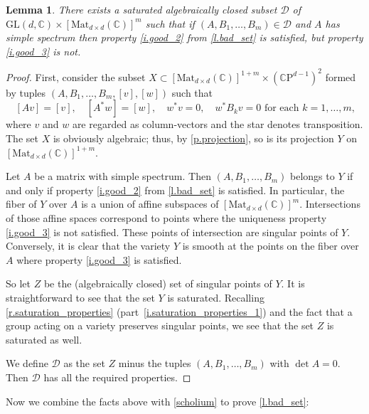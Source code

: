 \documentclass[10pt, a4paper]{amsart}
\theoremstyle{plain}
\newtheorem{lemma}{Lemma}[section]
\theoremstyle{definition}
\theoremstyle{remark}
\theoremstyle{note}
\numberwithin{equation}{section}
\begin{document}
\begin{lemma}\label{l.double_zero}
There exists a saturated algebraically closed subset 
${\mathcal{D}}$ of ${\mathrm{GL}}(d,{\mathbb{C}})\times [{\mathrm{Mat}}_{d\times d}({\mathbb{C}})]^m$ 
such that
if $(A, B_1, \dots, B_m) \in {\mathcal{D}}$ and $A$ has simple spectrum then 
property \ref{i.good_2} from \cref{l.bad_set} is satisfied, 
but property \ref{i.good_3} is not.
\end{lemma}

\begin{proof}
First, consider the subset $X \subset [{\mathrm{Mat}}_{d\times d}({\mathbb{C}})]^{1+m} \times ({\mathbb{C}\mathrm{P}}^{d-1})^2$
formed by tuples $(A,B_1,\dots,B_m,[v],[w])$ such that
$$
[Av] = [v], \quad [A^* w] = [w], \quad w^* v = 0, \quad w^* B_k v = 0 \text{ for each $k=1,\dots,m$,}
$$
where $v$ and $w$ are regarded as column-vectors and the star denotes transposition.
The set $X$ is obviously algebraic; thus, by \cref{p.projection}, so is its projection
$Y$ on $[{\mathrm{Mat}}_{d\times d}({\mathbb{C}})]^{1+m}$.

Let $A$ be a matrix with simple spectrum.
Then $(A, B_1, \dots, B_m)$
belongs to $Y$ if and only if property \ref{i.good_2} from \cref{l.bad_set} is satisfied.
In particular, the fiber of $Y$ over $A$ is 
a union of affine subspaces of $[{\mathrm{Mat}}_{d\times d}({\mathbb{C}})]^m$.
Intersections of those affine spaces correspond to points where the uniqueness 
property \ref{i.good_3} is not satisfied.
These points of intersection are singular points of $Y$.
Conversely, it is clear that the variety $Y$ is smooth at the points on the fiber over $A$
where property \ref{i.good_3} is satisfied.

So let $Z$ be the (algebraically closed) set of singular points of $Y$.
It is straightforward to see that the set $Y$ is saturated.
Recalling \cref{r.saturation_properties} (part~\ref{i.saturation_properties_1})
and the fact that a group acting on a variety preserves singular points,
we see that the set $Z$ is saturated as well.

We define ${\mathcal{D}}$ as the set $Z$ minus the tuples $(A, B_1, \dots, B_m)$ with $\det A = 0$.
Then ${\mathcal{D}}$ has all the required properties.
\end{proof}

Now we combine the facts above with \cref{scholium}
to prove \cref{l.bad_set}:
\end{document}
